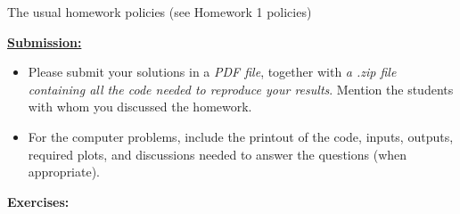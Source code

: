 \documentclass[10pt,twoside]{article}
\begin{document}
\vspace{0.2in}

The usual homework policies (see Homework 1 policies)

\vspace{0.1in}

\textbf{\underline{Submission:}}

\begin{itemize}
\item Please submit your solutions in a \emph{PDF file}, together with \emph{a .zip file containing all the code needed to reproduce your results}. Mention the students with whom you discussed the homework. 

\item For the computer problems, include the printout of the code, inputs, outputs, required plots, and discussions needed to answer the questions (when appropriate).

\end{itemize}


\textbf{Exercises:}

\vspace{0.1in}
\end{document}
